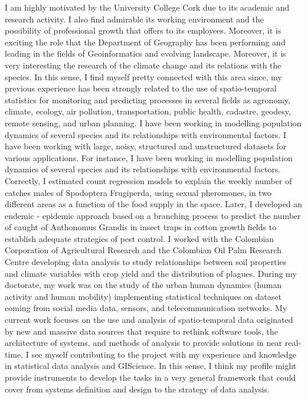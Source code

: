 \documentclass[11pt, a4paper]{awesome-cv}
\begin{document}
\begin{cvletter}
I am highly motivated by the University College Cork  due to its academic and research activity. I also find admirable its working environment and the possibility of professional growth that offers to its employees. Moreover, it is exciting the role that the Department of Geography has been performing and leading in the fields of Geoinformatics and evolving landscape. Moreover, it is very interesting the research of the climate change and its relations with the species. In this sense, I find myself pretty connected with this area since,  my previous experience has been strongly related to the use of spatio-temporal statistics for monitoring and predicting processes in several fields as agronomy, climate, ecology, air pollution, transportation, public health, cadastre, geodesy, remote sensing, and urban planning. I have been working in modelling population dynamics of several species and its relationships with environmental factors. I have been working with large, noisy, structured and unstructured datasets for various applications. For instance, I have been working in modelling population dynamics of several species and its relationships with environmental factors. Correctly, I estimated count regression models to explain the weekly number of catches males of Spodoptera Frugiperda, using sexual pheromones, in two different areas as a function of the food supply in the space. Later, I developed an endemic - epidemic approach based on a branching process to predict the number of caught of Anthonomus Grandis in insect traps in cotton growth fields to establish adequate strategies of pest control. I worked with the Colombian Corporation of Agricultural Research and the Colombian Oil Palm Research Centre developing data analysis to study relationships between soil properties and climate variables with crop yield and the distribution of plagues. During my doctorate, my work was on the study of the urban human dynamics (human activity and human mobility) implementing statistical techniques on dataset coming from social media data, sensors, and telecommunication networks. My current work focuses on the use and analysis of spatio-temporal data originated by new and massive data sources that require to rethink software tools, the architecture of systems, and methods of analysis to provide solutions in near real-time. I see myself contributing to the project with my experience and knowledge in statistical data analysis and GIScience. In this sense, I think my profile might provide instruments to develop the tasks in a very general framework that could cover from systems definition and design to the strategy of data analysis.\par

\end{cvletter}
\end{document}
